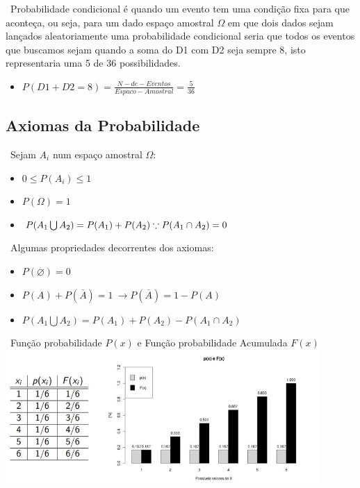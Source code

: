 \documentclass{article}
\begin{document}
        \ Probabilidade condicional é quando um evento tem uma condição fixa para que aconteça, ou seja, para um dado
        espaço amostral $ \Omega $ em que dois dados sejam lançados aleatoriamente uma probabilidade condicional seria
        que todos os eventos que buscamos sejam quando a soma do D1 com D2 seja sempre 8, isto representaria uma 5 de 36 possibilidades.

        \begin{itemize}
            \item $ P( D1+D2 = 8 ) = \frac{N-de-Eventos}{Espaco-Amostral} = \frac{5}{36} $
        \end{itemize}
    \subsection{Axiomas da Probabilidade}

        \begin{multicols}{2}

        \ Sejam $ A_i $ num espaço amostral $ \Omega: $
        \begin{itemize}
          \item $ 0 \leqslant P(A_i) \leqslant 1 $
          \item $ P(\Omega) = 1 $
          \item $ P(A_1 \bigcup A_2) = P(A_1) + P(A_2)\\ \because P(A_1 \cap A_2) = 0 $
        \end{itemize}
        
        \ Algumas propriedades decorrentes dos axiomas:
        
        \begin{itemize}
          \item $ P( \varnothing ) = 0 $
          \item $ P(A) + P(\overset{\_}{A}) = 1 \ \rightarrow P(\overset{\_}{A}) = 1 - P(A) $
          \item $ P(A_1 \bigcup A_2) = P(A_1) + P(A_2) - P(A_1 \cap A_2) $
        \end{itemize}

        \end{multicols}

    \begin{center}
        \ Função probabilidade $ P(x) $ e Função probabilidade Acumulada $ F(x) $
        {\includegraphics[width=12cm]{Função Prob e Prob Acumulada.jpg}}
    \end{center}
      
\end{document}

